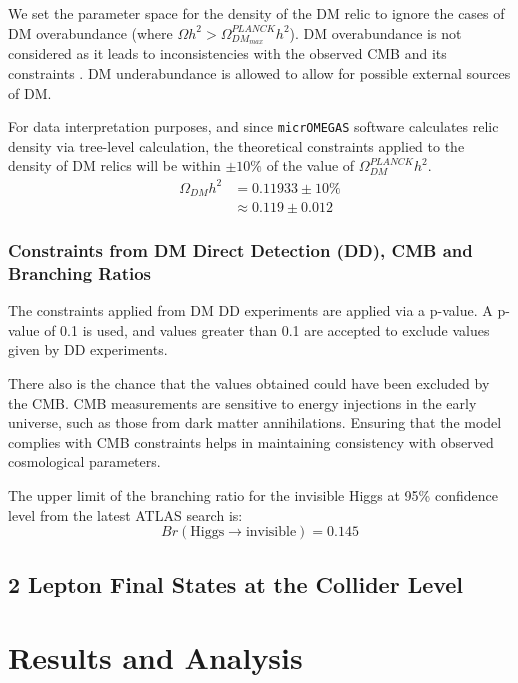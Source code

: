 \documentclass[12pt]{article}
\begin{document}
We set the parameter space for the density of the DM relic to ignore the cases of DM overabundance (where $\Omega h^2 > \Omega^{PLANCK}_{DM_{max}}h^2$). DM overabundance is not considered as it leads to inconsistencies with the observed CMB and its constraints \cite{Croon_2024, Zavala_2010}. DM underabundance is allowed to allow for possible external sources of DM.

For data interpretation purposes, and since \verb|micrOMEGAS| software calculates relic density via tree-level calculation, the theoretical constraints applied to the density of DM relics will be within $\pm10\%$ of the value of $\Omega ^{PLANCK}_{DM} h^2$.
\begin{equation}
    \begin{split}
        \Omega_{DM} h^2 &= 0.11933 \pm 10\% \\
        &\approx 0.119 \pm 0.012
    \end{split}
    \label{eqn:DM relic density value}
\end{equation}

\subsubsection{Constraints from DM Direct Detection (DD), CMB and Branching Ratios}
The constraints applied from DM DD experiments are applied via a p-value. A p-value of 0.1 is used, and values greater than 0.1 are accepted to exclude values given by DD experiments.

There also is the chance that the values obtained could have been excluded by the CMB. CMB measurements are sensitive to energy injections in the early universe, such as those from dark matter annihilations. Ensuring that the model complies with CMB constraints helps in maintaining consistency with observed cosmological parameters. 

The upper limit of the branching ratio for the invisible Higgs at 95\% confidence level from the latest ATLAS search is\cite{ATLAS:2022yvh}:
\begin{equation}
    Br(\text{Higgs} \rightarrow \text{invisible}) = 0.145
    \label{eqn:branching_ratio}
\end{equation}
\subsection{2 Lepton Final States at the Collider Level}

\section{Results and Analysis}
\label{sec:results}
\end{document}
